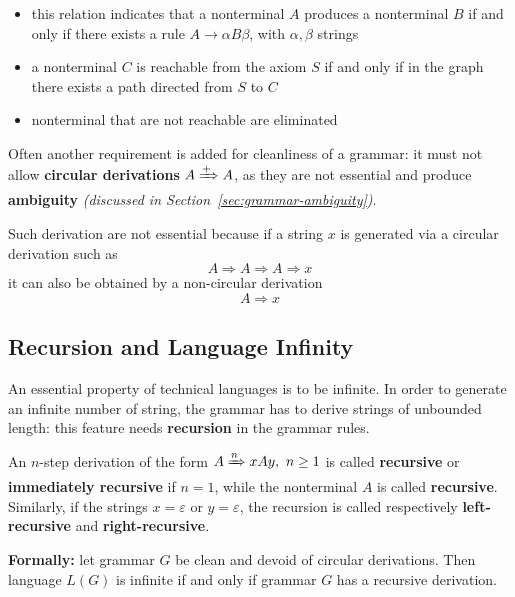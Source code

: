 \documentclass[english]{article}
\begin{document}
\begin{enumerate}[label=\textbf{step \arabic*}:, ref=(\textbf{\arabic*}), left=20pt]
        \begin{itemize}
          \item this relation indicates that a nonterminal \(A\) produces a nonterminal \(B\) if and only if there exists a rule \(A \rightarrow \alpha B \beta\), with \(\alpha, \beta\) strings
          \item a nonterminal \(C\) is reachable from the axiom \(S\) if and only if in the graph there exists a path directed from \(S\) to \(C\)
          \item nonterminal that are not reachable are eliminated
        \end{itemize}
\end{enumerate}

\bigskip
Often another requirement is added for cleanliness of a grammar: it must not allow \textbf{circular derivations} \(A \xRightarrow{+} A\), as they are not essential and produce \textbf{ambiguity} \textit{(discussed in Section~\ref{sec:grammar-ambiguity})}.

Such derivation are not essential because if a string \(x\) is generated via a circular derivation such as
\[ A \Rightarrow A \Rightarrow A \Rightarrow x \]
it can also be obtained by a non-circular derivation
\[ A \Rightarrow x \]

\subsection{Recursion and Language Infinity}

An essential property of technical languages is to be infinite.
In order to generate an infinite number of string, the grammar has to derive strings of unbounded length:
this feature needs \textbf{recursion} in the grammar rules.

An \(n\)-step derivation of the form \(A \xRightarrow{n} x A y, \ n \geq 1\) is called \textbf{recursive} or \textbf{immediately recursive} if \(n=1\), while the nonterminal \(A\) is called \textbf{recursive}.
Similarly, if the strings \(x=\varepsilon\) or \(y=\varepsilon\), the recursion is called respectively \textbf{left-recursive} and \textbf{right-recursive}.

\bigskip
\textbf{Formally:} let grammar \(G\) be clean and devoid of circular derivations.
Then language \(L(G)\) is infinite if and only if grammar \(G\) has a recursive derivation.
\end{document}
